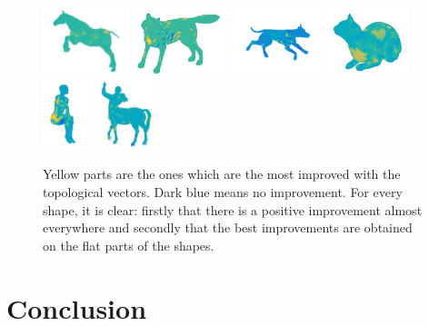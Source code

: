 \begin{figure}[t!] 
\begin{center} 
\includegraphics[height = 2cm]{figures/imprhorse910}
\includegraphics[height = 2cm]{figures/imprwolf2}  
\includegraphics[height = 2cm]{figures/imprdog1105}  
\includegraphics[height = 2cm]{figures/imprcat7}  
\includegraphics[height = 2cm]{figures/imprhuman1407}
\includegraphics[height = 2cm]{figures/imprcentaur704}  

\caption[Improvements measured directly on shapes]{\label{fig:improvementsonshape} Yellow parts are the ones which are the most improved with the topological vectors. 
        Dark blue means no improvement. For every shape, it is clear: firstly that there is a positive improvement almost everywhere
	      and secondly that the best improvements are obtained on the flat parts of the shapes.}
\end{center}
\end{figure}


\section{Conclusion}

